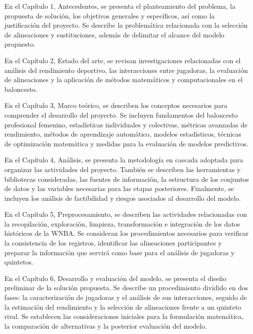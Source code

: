 En el Capítulo 1, Antecedentes, se presenta el planteamiento del problema, la propuesta de solución, los objetivos generales y específicos, así como la justificación del proyecto. Se describe la problemática relacionada con la selección de alineaciones y sustituciones, además de delimitar el alcance del modelo propuesto.

En el Capítulo 2, Estado del arte, se revisan investigaciones relacionadas con el análisis del rendimiento deportivo, las interacciones entre jugadoras, la evaluación de alineaciones y la aplicación de métodos matemáticos y computacionales en el baloncesto. 

En el Capítulo 3, Marco teórico, se describen los conceptos necesarios para comprender el desarrollo del proyecto. Se incluyen fundamentos del baloncesto profesional femenino, estadísticas individuales y colectivas, métricas avanzadas de rendimiento, métodos de aprendizaje automático, modelos estadísticos, técnicas de optimización matemática y medidas para la evaluación de modelos predictivos.

En el Capítulo 4, Análisis, se presenta la metodología en cascada adoptada para organizar las actividades del proyecto. También se describen las herramientas y bibliotecas consideradas, las fuentes de información, la estructura de los conjuntos de datos y las variables necesarias para las etapas posteriores. Finalmente, se incluyen los análisis de factibilidad y riesgos asociados al desarrollo del modelo.

En el Capítulo 5, Preprocesamiento, se describen las actividades relacionadas con la recopilación, exploración, limpieza, transformación e integración de los datos históricos de la WNBA. Se consideran los procedimientos necesarios para verificar la consistencia de los registros, identificar las alineaciones participantes y preparar la información que servirá como base para el análisis de jugadoras y quintetos.

En el Capítulo 6, Desarrollo y evaluación del modelo, se presenta el diseño preliminar de la solución propuesta. Se describe un procedimiento dividido en dos fases: la caracterización de jugadoras y el análisis de sus interacciones, seguido de la estimación del rendimiento y la selección de alineaciones frente a un quinteto rival. Se establecen las consideraciones iniciales para la formulación matemática, la comparación de alternativas y la posterior evaluación del modelo.